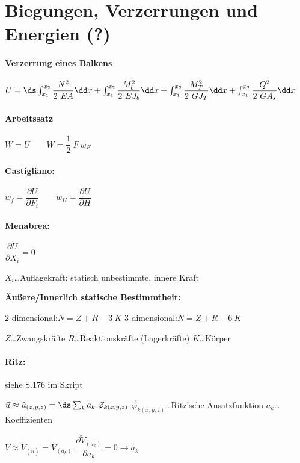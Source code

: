 \section{Biegungen, Verzerrungen und Energien (?)}

\paragraph{ Verzerrung eines Balkens}
	$ U = \ds
	      \int_{x_1}^{x_2} \dfrac{N^2}  {2\ E A}   \dd x
	    + \int_{x_1}^{x_2} \dfrac{M_b^2}{2\ E J_b} \dd x 
	    + \int_{x_1}^{x_2} \dfrac{M_T^2}{2\ G J_T} \dd x 
	    + \int_{x_1}^{x_2} \dfrac{Q^2}  {2\ G A_s} \dd x $

\paragraph{ Arbeitssatz}
	$ W = U \qquad 
		W = \dfrac{1}{2}\ F\ w_F$

\paragraph{ Castigliano:}
	$ w_f  = \dfrac{\partial U}{\partial F_i} \qquad w_H = \dfrac{\partial U}{\partial H} $
	
\paragraph{ Menabrea:}
	$ \dfrac{\partial U}{\partial X_i} = 0 $
		
		\vskip 3pt
	$ X_i $\dots Auflagekraft; statisch unbestimmte, innere Kraft
	
	\textbf{Äußere/Innerlich statische Bestimmtheit:}
	
	2-dimensional:\quad $ N = Z + R - 3\ K $
		\hfil 3-dimensional:\quad $ N = Z + R - 6\ K $ \hfil
	
	$ Z $\dots Zwangskräfte
		\qquad $ R $\dots Reaktionskräfte (Lagerkräfte)
		\qquad $ K $\dots Körper
	
\paragraph{ Ritz:} \quad siehe S.176 im Skript
	
	$ \vec{u} \approx \tilde{u}_{(x,y,z)} = \ds\sum_k a_k\ \vec{\varphi}_{k(x,y,z)} $
		\qquad $ \vec{\varphi}_{k(x,y,z)} $\dots Ritz'sche Ansatzfunktion
		\qquad $ a_k $\dots Koeffizienten
	
	$ V \approx \tilde{V}_{(\tilde{u})} = \tilde{V}_{(a_k)} $
		\qquad $ \dfrac{\partial \tilde{V}_{(a_k)}}{\partial a_k} = 0 \rightarrow a_k $
		
